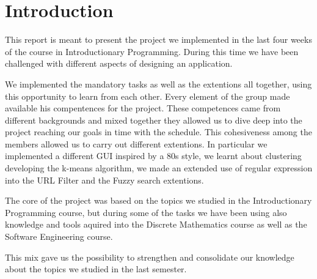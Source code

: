 \section{Introduction}
This report is meant to present the project we implemented in the last four weeks of the course in Introductionary Programming. During this time we have been challenged with different aspects of designing an application. 

We implemented the mandatory tasks as well as the extentions all together, using this opportunity to learn from each other. Every element of the group made available his compentences for the project. These competences came from different backgrounds and mixed together they allowed us to dive deep into the project reaching our goals in time with the schedule. This cohesiveness among the members allowed us to carry out different extentions. In particular we implemented a different GUI inspired by a 80s style, we learnt about clustering developing the k-means algorithm, we made an extended use of regular expression into the  URL Filter and the Fuzzy search extentions.

The core of the project was based on the topics we studied in the Introductionary Programming course, but during some of the tasks we have been using also knowledge and tools aquired into the Discrete Mathematics course as well as the Software Engineering course.

This mix gave us the possibility to strengthen and consolidate our knowledge about the topics we studied in the last semester.
